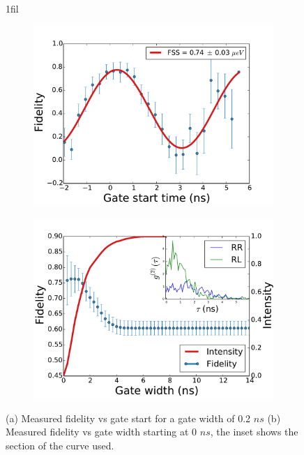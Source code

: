 \documentclass[12pt, twoside]{article}
\makeatletter
\numberwithin{equation}{section}
\newcommand*{\centerfloat}{%
  \parindent \z@
  \leftskip \z@ \@plus 1fil \@minus \textwidth
  \rightskip\leftskip
  \parfillskip \z@skip}
\makeatother
\begin{document}
\begin{figure}
\centerfloat
\begin{subfigure}{.5\textwidth}
  \centering
  \includegraphics[width=1\linewidth]{notebooks/fidelity_gatestart.pdf}
  \caption{}
  \label{fig:sub1}
\end{subfigure}%
\begin{subfigure}{.5\textwidth}
  \centering
  \includegraphics[width=1\linewidth]{notebooks/fidelity_gatewidth.pdf}
  \caption{}
  \label{fig:decaypath}
\end{subfigure}
\caption{(a) Measured fidelity vs gate start for a gate width of 0.2 $ns$ (b) Measured fidelity vs gate width starting at 0 $ns$, the inset shows the section of the curve used.}
\label{fig:timegatedata}
\end{figure}
\end{document}
